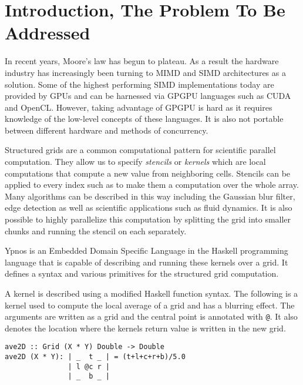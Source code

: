 





\section*{Introduction, The Problem To Be Addressed}

In recent years, Moore's law has begun to plateau. As a result the hardware 
industry has increasingly been turning to MIMD and SIMD architectures as a 
solution.  Some of the highest performing SIMD implementations today are 
provided by GPUs and can be harnessed via GPGPU languages such as CUDA and 
OpenCL.  However, taking advantage of GPGPU is hard as it requires knowledge of 
the low-level concepts of these languages. It is also not portable between 
different hardware and methods of concurrency.

Structured grids are a common computational pattern for scientific parallel 
computation. They allow us to specify \emph{stencils} or \emph{kernels} which 
are local computations that compute a new value from neighboring cells.  
Stencils can be applied to every index such as to make them a computation over 
the whole array.  Many algorithms can be described in this way including the 
Gaussian blur filter, edge detection as well as scientific applications such as 
fluid dynamics. It is also possible to highly parallelize this computation by 
splitting the grid into smaller chunks and running the stencil on each 
separately.

Ypnos \cite{ypnos} is an Embedded Domain Specific Language in the Haskell 
programming language that is capable of describing and running these kernels 
over a grid.  It defines a syntax and various primitives for the structured 
grid computation.  

A kernel is described using a modified Haskell function syntax. The following 
is a kernel used to compute the local average of a grid and has a blurring 
effect.  The arguments are written as a grid and the central point is annotated 
with \verb|@|. It also denotes the location where the kernels return value is 
written in the new grid.

\begin{verbatim}
ave2D :: Grid (X * Y) Double -> Double
ave2D (X * Y): | _  t _ | = (t+l+c+r+b)/5.0
               | l @c r |
               | _  b _ |
\end{verbatim}

